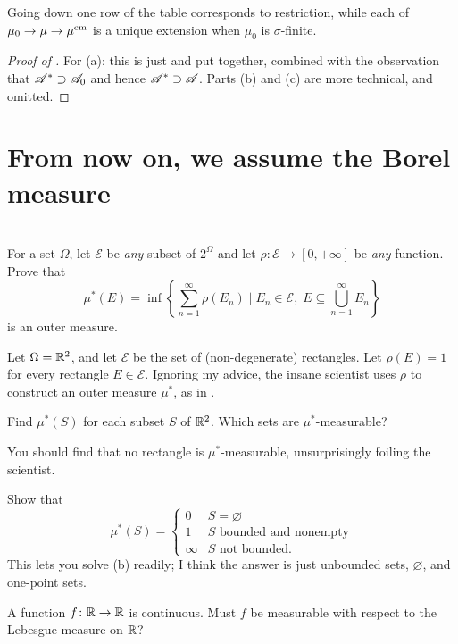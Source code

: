 Going down one row of the table corresponds to restriction,
while each of $\mu_0 \to \mu \to \mu^\text{cm}$ is a unique extension
when $\mu_0$ is $\sigma$-finite.
\begin{proof}
	[Proof of ]
	For (a): this is just  and 
	put together, combined with the observation that $\mathscr A^\ast \supset \mathscr A_0$
	and hence $\mathscr A^\ast \supset \mathscr A$.
	Parts (b) and (c) are more technical, and omitted.
\end{proof}

\section{From now on, we assume the Borel measure}

\section{\problemhead}
\begin{dproblem}
	\label{pr:construct_outer_measure}
	For a set $\Omega$,
	let $\mathcal{E}$ be \emph{any} subset of $2^{\Omega}$
	and let $\rho \colon \mathcal{E} \to [0,+\infty]$
	be \emph{any} function.
	Prove that
	\[ \mu^\ast(E) = \inf \left\{ \sum_{n=1}^\infty \rho(E_n) \mid
		E_n \in \mathcal{E}, \;
		E \subseteq \bigcup_{n=1}^\infty E_n \right\} \]
	is an outer measure.
\end{dproblem}

\begin{problem}
	Let $\Omega = \mathbb R^2$, and let $\mathcal{E}$
	be the set of (non-degenerate) rectangles.
	Let $\rho(E) = 1$ for every rectangle $E \in \mathcal{E}$.
	Ignoring my advice, the insane scientist
	uses $\rho$ to construct an outer measure $\mu^\ast$,
	as in .
	\begin{enumerate}[(a)]
		\ii Find $\mu^\ast(S)$ for each subset $S$ of $\mathbb R^2$.
		\ii Which sets are $\mu^\ast$-measurable?
	\end{enumerate}
	You should find that no rectangle is $\mu^\ast$-measurable,
	unsurprisingly foiling the scientist.
	\begin{hint}
		Show that
		\[ \mu^\ast(S) = \begin{cases}
				0 & S = \varnothing \\
				1 & S \text{ bounded and nonempty} \\
				\infty & S \text{ not bounded}.
			\end{cases}
		\]
		This lets you solve (b) readily;
		I think the answer is just unbounded sets,
		$\varnothing$, and one-point sets.
	\end{hint}
\end{problem}

\begin{problem}
	\onechili
	A function $f \colon \mathbb R \to \mathbb R$ is continuous.
	Must $f$ be measurable with respect to the Lebesgue measure on $\mathbb R$?
\end{problem}
